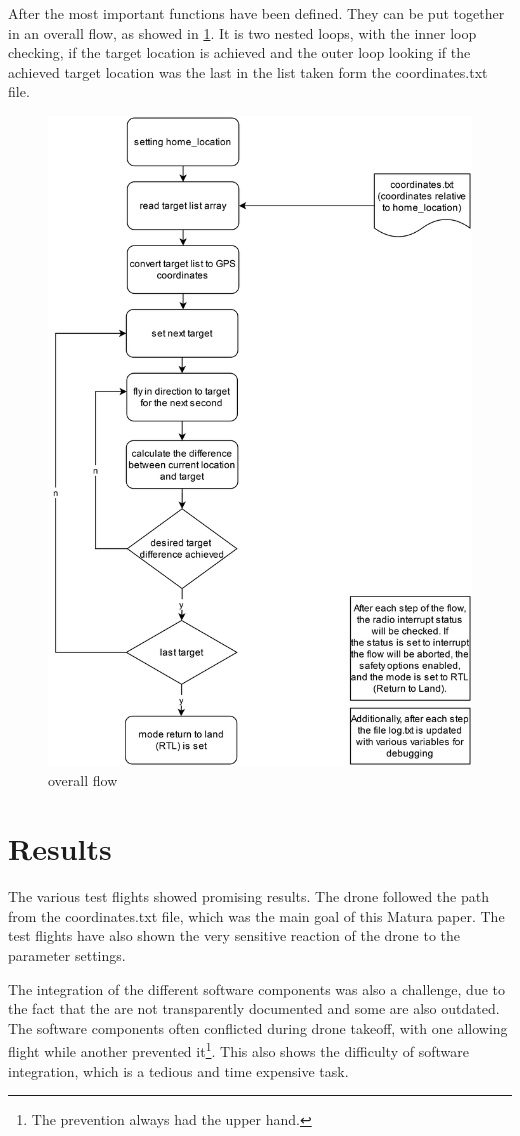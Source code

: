 \documentclass[svgnames]{article}
\begin{document}
	After the most important functions have been defined. They can be put together in an overall flow, as showed in \cref{fig:pythonflow}. It is two nested loops, with the inner loop checking, if the target location is achieved and the outer loop looking if the achieved target location was the last in the list taken form the coordinates.txt file.
		\pagebreak
\begin{figure}[ht]
	\centering
	\includegraphics[width=0.7\linewidth]{pictures/pythonflow}
	\caption{overall flow}
	\label{fig:pythonflow}
\end{figure}

	\section{Results}

	The various test flights showed promising results. The drone followed the path from the coordinates.txt file, which was the main goal of this Matura paper. The test flights have also shown the very sensitive reaction of the drone to the parameter settings. 
	
	The integration of the different software components was also a challenge, due to the fact that the  are not transparently documented and some are also outdated. The software components often conflicted during drone takeoff, with one allowing flight while another prevented it\footnote{The prevention always had the upper hand.}. This also shows the difficulty of software integration, which is a tedious and time expensive task.
\end{document}
